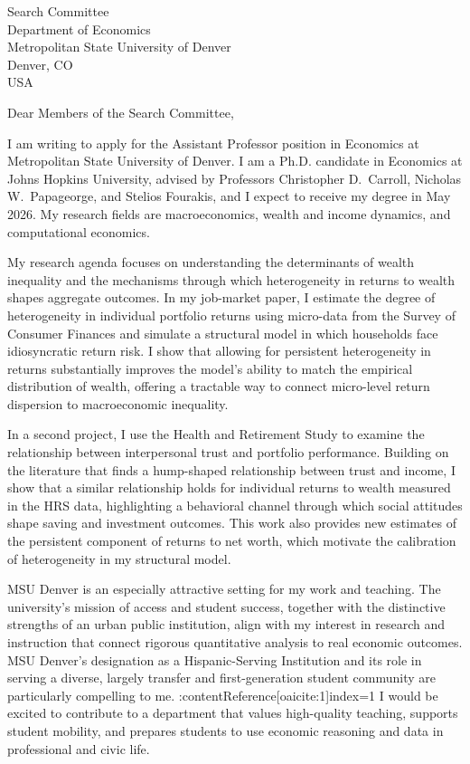 \documentclass[11pt,letterpaper]{letter}
\begin{document}
\begin{letter}{Search Committee \\
Department of Economics \\
Metropolitan State University of Denver \\
Denver, CO \\ USA}

\opening{Dear Members of the Search Committee,}

I am writing to apply for the Assistant Professor position in Economics at Metropolitan State University of Denver. I am a Ph.D. candidate in Economics at Johns Hopkins University, advised by Professors Christopher D.~Carroll, Nicholas W.~Papageorge, and Stelios Fourakis, and I expect to receive my degree in May 2026. My research fields are macroeconomics, wealth and income dynamics, and computational economics.

My research agenda focuses on understanding the determinants of wealth inequality and the mechanisms through which heterogeneity in returns to wealth shapes aggregate outcomes. In my job-market paper, I estimate the degree of heterogeneity in individual portfolio returns using micro-data from the Survey of Consumer Finances and simulate a structural model in which households face idiosyncratic return risk. I show that allowing for persistent heterogeneity in returns substantially improves the model’s ability to match the empirical distribution of wealth, offering a tractable way to connect micro-level return dispersion to macroeconomic inequality.

In a second project, I use the Health and Retirement Study to examine the relationship between interpersonal trust and portfolio performance. Building on the literature that finds a hump-shaped relationship between trust and income, I show that a similar relationship holds for individual returns to wealth measured in the HRS data, highlighting a behavioral channel through which social attitudes shape saving and investment outcomes. This work also provides new estimates of the persistent component of returns to net worth, which motivate the calibration of heterogeneity in my structural model.

MSU Denver is an especially attractive setting for my work and teaching. The university’s mission of access and student success, together with the distinctive strengths of an urban public institution, align with my interest in research and instruction that connect rigorous quantitative analysis to real economic outcomes. MSU Denver’s designation as a Hispanic-Serving Institution and its role in serving a diverse, largely transfer and first-generation student community are particularly compelling to me. :contentReference[oaicite:1]{index=1} I would be excited to contribute to a department that values high-quality teaching, supports student mobility, and prepares students to use economic reasoning and data in professional and civic life.


\end{letter}
\end{document}
